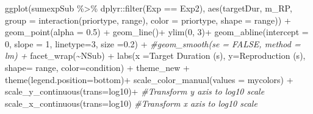 \documentclass[
]{article}
\newenvironment{Shaded}{\begin{snugshade}}{\end{snugshade}}
\newcommand{\AttributeTok}[1]{\textcolor[rgb]{0.77,0.63,0.00}{#1}}
\newcommand{\CommentTok}[1]{\textcolor[rgb]{0.56,0.35,0.01}{\textit{#1}}}
\newcommand{\DecValTok}[1]{\textcolor[rgb]{0.00,0.00,0.81}{#1}}
\newcommand{\FloatTok}[1]{\textcolor[rgb]{0.00,0.00,0.81}{#1}}
\newcommand{\FunctionTok}[1]{\textcolor[rgb]{0.00,0.00,0.00}{#1}}
\newcommand{\NormalTok}[1]{#1}
\newcommand{\SpecialCharTok}[1]{\textcolor[rgb]{0.00,0.00,0.00}{#1}}
\newcommand{\StringTok}[1]{\textcolor[rgb]{0.31,0.60,0.02}{#1}}
\begin{document}
\begin{Shaded}
\begin{Highlighting}[]
\FunctionTok{ggplot}\NormalTok{(sumexpSub }\SpecialCharTok{\%\textgreater{}\%}\NormalTok{ dplyr}\SpecialCharTok{::}\FunctionTok{filter}\NormalTok{(Exp }\SpecialCharTok{==} \StringTok{\textquotesingle{}Exp2\textquotesingle{}}\NormalTok{), }\FunctionTok{aes}\NormalTok{(targetDur, m\_RP, }\AttributeTok{group =} \FunctionTok{interaction}\NormalTok{(priortype, range), }\AttributeTok{color =}\NormalTok{ priortype, }\AttributeTok{shape =}\NormalTok{ range)) }\SpecialCharTok{+} 
  \FunctionTok{geom\_point}\NormalTok{(}\AttributeTok{alpha =} \FloatTok{0.5}\NormalTok{) }\SpecialCharTok{+} 
  \FunctionTok{geom\_line}\NormalTok{()}\SpecialCharTok{+}
  \FunctionTok{ylim}\NormalTok{(}\DecValTok{0}\NormalTok{, }\DecValTok{3}\NormalTok{)}\SpecialCharTok{+}
  \FunctionTok{geom\_abline}\NormalTok{(}\AttributeTok{intercept =} \DecValTok{0}\NormalTok{, }\AttributeTok{slope =} \DecValTok{1}\NormalTok{, }\AttributeTok{linetype=}\DecValTok{3}\NormalTok{, }\AttributeTok{size =}\FloatTok{0.2}\NormalTok{) }\SpecialCharTok{+}
  \CommentTok{\#geom\_smooth(se = FALSE, method = \textquotesingle{}lm\textquotesingle{}) +}
  \FunctionTok{facet\_wrap}\NormalTok{(}\SpecialCharTok{\textasciitilde{}}\NormalTok{NSub) }\SpecialCharTok{+}
  \FunctionTok{labs}\NormalTok{(}\AttributeTok{x =}\StringTok{\textquotesingle{}Target Duration (s)\textquotesingle{}}\NormalTok{, }\AttributeTok{y=}\StringTok{\textquotesingle{}Reproduction (s)\textquotesingle{}}\NormalTok{, }\AttributeTok{shape=} \StringTok{\textquotesingle{}range\textquotesingle{}}\NormalTok{, }\AttributeTok{color=}\StringTok{\textquotesingle{}condition\textquotesingle{}}\NormalTok{) }\SpecialCharTok{+}\NormalTok{ theme\_new }\SpecialCharTok{+} \FunctionTok{theme}\NormalTok{(}\AttributeTok{legend.position=}\StringTok{\textquotesingle{}bottom\textquotesingle{}}\NormalTok{)}\SpecialCharTok{+}
  \FunctionTok{scale\_color\_manual}\NormalTok{(}\AttributeTok{values =}\NormalTok{ mycolors) }\SpecialCharTok{+}
  \FunctionTok{scale\_y\_continuous}\NormalTok{(}\AttributeTok{trans=}\StringTok{\textquotesingle{}log10\textquotesingle{}}\NormalTok{)}\SpecialCharTok{+} \CommentTok{\#Transform y axis to log10 scale}
  \FunctionTok{scale\_x\_continuous}\NormalTok{(}\AttributeTok{trans=}\StringTok{\textquotesingle{}log10\textquotesingle{}}\NormalTok{) }\CommentTok{\#Transform x axis to log10 scale}
\end{Highlighting}
\end{Shaded}
\end{document}

